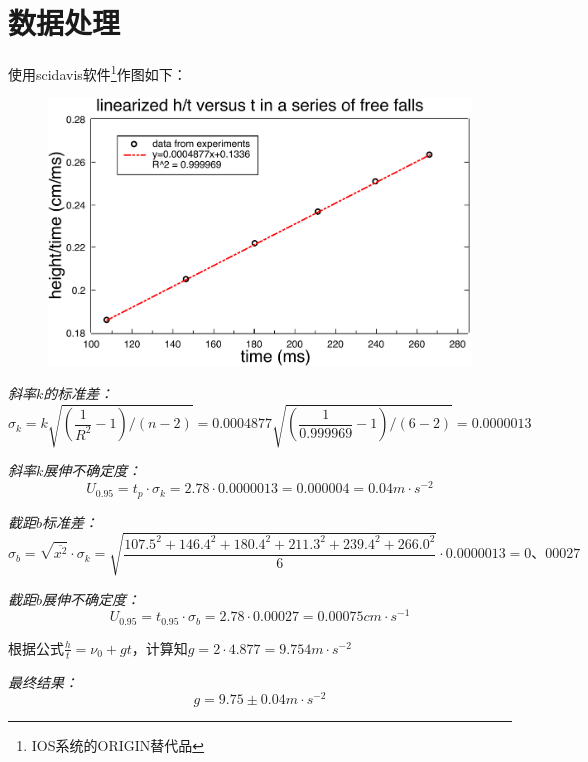 \documentclass[UTF8]{ctexart}
\begin{document}
    
    \section{数据处理}
    使用scidavis软件\footnote{IOS系统的ORIGIN替代品}作图如下：
    \begin{figure}[ht]
        \centering 
        \includegraphics[width=13cm]{linearized.pdf}
    \end{figure}

    \emph{斜率$k$的标准差：}\cite{daolun}
    \begin{equation}
        \sigma_k =k\sqrt{(\frac{1}{R^2}-1)/(n-2)}=0.0004877\sqrt{(\frac{1}{0.999969}-1)/(6-2)} =0.0000013
    \end{equation}

    \emph{斜率$k$展伸不确定度：}\cite{daolun}
    \begin{equation}
        U_{0.95}=t_p·\sigma_k=2.78·0.0000013=0.000004=0.04m·s^{-2}
    \end{equation}

    \emph{截距$b$标准差：}\cite{daolun}
    \begin{equation}
        \sigma_b=\sqrt{\overline{{x^2}}}·\sigma_k=\sqrt{\frac{107.5^2+146.4^2+180.4^2+211.3^2+239.4^2+266.0^2}{6}}·0.0000013=0、00027
    \end{equation}

    \emph{截距$b$展伸不确定度：}\cite{daolun}
    \begin{equation}
        U_{0.95}=t_{0.95}·\sigma_b=2.78·0.00027=0.00075cm·s^{-1}
    \end{equation}

    根据公式$\frac{h}{t}=\nu_0+gt$，计算知$g=2·4.877=9.754m·s^{-2}$


    \emph{最终结果：}
    \begin{equation}
        g=9.75±0.04m·s^{-2}
    \end{equation}
\end{document}
